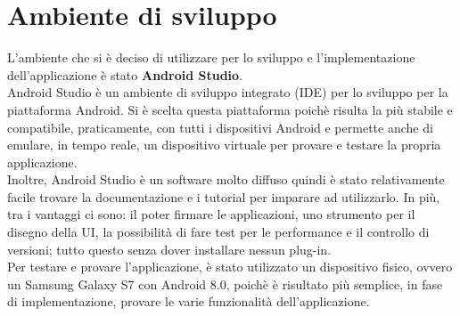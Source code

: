 \section{Ambiente di sviluppo}

L'ambiente che si è deciso di utilizzare per lo sviluppo e l'implementazione dell'applicazione è stato \textbf{Android Studio}.
\\Android Studio è un ambiente di sviluppo integrato (IDE) per lo sviluppo per la piattaforma Android. Si è scelta questa piattaforma poichè risulta la più stabile e compatibile, praticamente, con tutti i dispositivi Android e permette anche di emulare, in tempo reale, un dispositivo virtuale per provare e testare la propria applicazione.
\\Inoltre, Android Studio è un software molto diffuso quindi è stato relativamente facile trovare la documentazione e i tutorial per imparare ad utilizzarlo. In più, tra i vantaggi ci sono: il poter firmare le applicazioni, uno strumento per il disegno della UI, la possibilità di fare test per le performance e il controllo di versioni; tutto questo senza dover installare nessun plug-in.
\\Per testare e provare l'applicazione, è stato utilizzato un dispositivo fisico, ovvero un Samsung Galaxy S7 con Android 8.0, poichè è risultato più semplice, in fase di implementazione, provare le varie funzionalità dell'applicazione.

